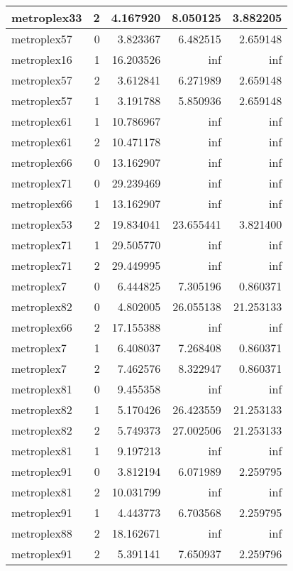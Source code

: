 \documentclass[../../../thesis.tex]{subfiles}
\begin{document}
\begin{longtable}{|l|r|r|r|r|}
metroplex33 & 2 & 4.167920 & 8.050125 & 3.882205 \\\hline
metroplex57 & 0 & 3.823367 & 6.482515 & 2.659148 \\\hline
metroplex16 & 1 & 16.203526 & inf & inf \\\hline
metroplex57 & 2 & 3.612841 & 6.271989 & 2.659148 \\\hline
metroplex57 & 1 & 3.191788 & 5.850936 & 2.659148 \\\hline
metroplex61 & 1 & 10.786967 & inf & inf \\\hline
metroplex61 & 2 & 10.471178 & inf & inf \\\hline
metroplex66 & 0 & 13.162907 & inf & inf \\\hline
metroplex71 & 0 & 29.239469 & inf & inf \\\hline
metroplex66 & 1 & 13.162907 & inf & inf \\\hline
metroplex53 & 2 & 19.834041 & 23.655441 & 3.821400 \\\hline
metroplex71 & 1 & 29.505770 & inf & inf \\\hline
metroplex71 & 2 & 29.449995 & inf & inf \\\hline
metroplex7 & 0 & 6.444825 & 7.305196 & 0.860371 \\\hline
metroplex82 & 0 & 4.802005 & 26.055138 & 21.253133 \\\hline
metroplex66 & 2 & 17.155388 & inf & inf \\\hline
metroplex7 & 1 & 6.408037 & 7.268408 & 0.860371 \\\hline
metroplex7 & 2 & 7.462576 & 8.322947 & 0.860371 \\\hline
metroplex81 & 0 & 9.455358 & inf & inf \\\hline
metroplex82 & 1 & 5.170426 & 26.423559 & 21.253133 \\\hline
metroplex82 & 2 & 5.749373 & 27.002506 & 21.253133 \\\hline
metroplex81 & 1 & 9.197213 & inf & inf \\\hline
metroplex91 & 0 & 3.812194 & 6.071989 & 2.259795 \\\hline
metroplex81 & 2 & 10.031799 & inf & inf \\\hline
metroplex91 & 1 & 4.443773 & 6.703568 & 2.259795 \\\hline
metroplex88 & 2 & 18.162671 & inf & inf \\\hline
metroplex91 & 2 & 5.391141 & 7.650937 & 2.259796 \\\hline
\end{longtable}
\end{document}
